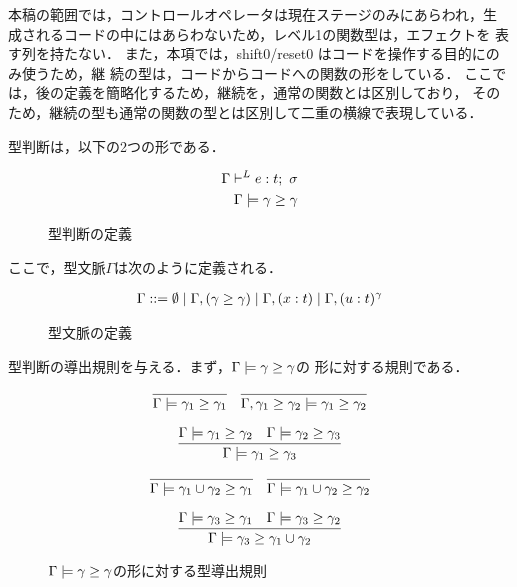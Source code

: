 \documentclass[dvipdfmx]{jsarticle}
\begin{document}
本稿の範囲では，コントロールオペレータは現在ステージのみにあらわれ，生
成されるコードの中にはあらわないため，レベル1の関数型は，エフェクトを
表す列を持たない．
また，本項では，shift0/reset0 はコードを操作する目的にのみ使うため，継
続の型は，コードからコードへの関数の形をしている．
ここでは，後の定義を簡略化するため，継続を，通常の関数とは区別しており，
そのため，継続の型も通常の関数の型とは区別して二重の横線で表現している．

型判断は，以下の2つの形である．

\begin{figure}[H]
  \centering
  \begin{align*}
    \Gamma \vdash^{L} e : t ;~\sigma \\
    \Gamma \models \gamma \ge \gamma
  \end{align*}
  \caption{型判断の定義}
  \label{fig:judgement_def}
\end{figure}

ここで，型文脈$\Gamma$は次のように定義される．

\begin{figure}[H]
  \centering
  \begin{align*}
    \Gamma ::= \emptyset
    \mid \Gamma, (\gamma \ge \gamma)
    \mid \Gamma, (x : t)
    \mid \Gamma, (u : t)^{\gamma}
  \end{align*}
  \caption{型文脈の定義}
  \label{fig:type_context_def}
\end{figure}


型判断の導出規則を与える．まず，$\Gamma \models \gamma \ge \gamma$の
形に対する規則である．

\begin{figure}[H]
  \centering
  \[
    \infer
    {\Gamma \models \gamma_1 \ord \gamma_1}
    {}
    \quad
    \infer
    {\Gamma, \gamma_1 \ord \gamma_2 \models \gamma_1 \ord \gamma_2}
    {}
  \]

  \[
    \infer
    {\Gamma \models \gamma_1 \ord \gamma_3}
    {\Gamma \models \gamma_1 \ord \gamma_2 & \Gamma \models \gamma_2 \ord \gamma_3}
  \]

  \[
    \infer
    {\Gamma \models \gamma_1 \cup \gamma_2 \ord \gamma_1}
    {}
    \quad
    \infer
    {\Gamma \models \gamma_1 \cup \gamma_2 \ord \gamma_2}
    {}
  \]

  \[
    \infer
    {\Gamma \models \gamma_3 \ord \gamma_1 \cup \gamma_2}
    {\Gamma \models \gamma_3 \ord \gamma_1
      &\Gamma \models \gamma_3 \ord \gamma_2}
  \]
  \caption{$\Gamma \models \gamma \ge \gamma$の形に対する型導出規則}
  \label{fig:gmg_rule}
\end{figure}
\end{document}
